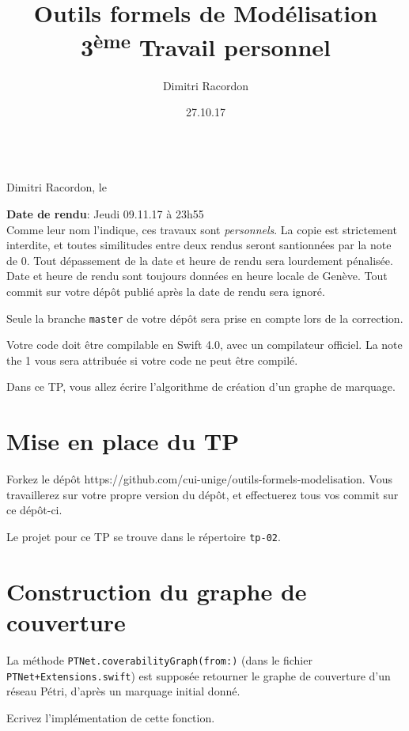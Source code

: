 \documentclass[a4paper, titlepage]{article}
\makeatletter
\numberwithin{figure}{section}
\numberwithin{table}{section}
\newcommand\deadline[1]{\def\@deadline{#1}}
\newcommand\objective[1]{\def\@objective{#1}}
\newcommand{\makecustomtitle}{%
	\begin{center}
		\huge\@title \\
		[1ex]\small Dimitri Racordon, le \@date
	\end{center}
	\begin{framed}\@deadline\end{framed}
	\begin{framed}\@objective\end{framed}
}
\makeatother
\begin{document}
\title{Outils formels de Modélisation \\ 3\textsuperscript{ème} Travail personnel}
\author{Dimitri Racordon}
\date{27.10.17}

\deadline{
\textbf{Date de rendu}: Jeudi 09.11.17 à 23h55 \\

  Comme leur nom l'indique, ces travaux sont \emph{personnels}.
  La copie est strictement interdite, et toutes similitudes entre deux rendus
  seront santionnées par la note de 0.
  Tout dépassement de la date et heure de rendu sera lourdement pénalisée.
  Date et heure de rendu sont toujours données en heure locale de Genève.
  Tout commit sur votre dépôt publié après la date de rendu sera ignoré.

  Seule la branche \texttt{master} de votre dépôt sera prise en compte
  lors de la correction.

  Votre code doit être compilable en Swift 4.0, avec un compilateur officiel.
  La note the 1 vous sera attribuée si votre code ne peut être compilé.
}

\objective{
  Dans ce TP, vous allez écrire l'algorithme de création d'un graphe de marquage.
}

\makecustomtitle

\section{Mise en place du TP}

Forkez le dépôt https://github.com/cui-unige/outils-formels-modelisation.
Vous travaillerez sur votre propre version du dépôt,
et effectuerez tous vos commit sur ce dépôt-ci.

Le projet pour ce TP se trouve dans le répertoire \texttt{tp-02}.

\section{Construction du graphe de couverture}

La méthode \texttt{PTNet.coverabilityGraph(from:)}
(dans le fichier \texttt{PTNet+Extensions.swift})
est supposée retourner le graphe de couverture d'un réseau Pétri,
d'après un marquage initial donné.

Ecrivez l'implémentation de cette fonction.
\end{document}
